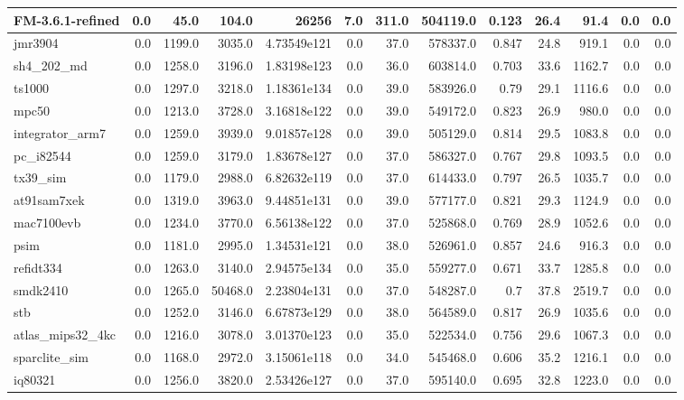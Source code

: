 \begin{tabular}{|l r r r r| r r r r r r | r r|}
\hline
FM-3.6.1-refined & 0.0 & 45.0 & 104.0 & 26256 & 7.0 & 311.0 & 504119.0 & 0.123 & 26.4 & 91.4 & 0.0 & 0.0 \\
\hline
jmr3904 & 0.0 & 1199.0 & 3035.0 & 4.73549e121 & 0.0 & 37.0 & 578337.0 & 0.847 & 24.8 & 919.1 & 0.0 & 0.0 \\
\hline
sh4\_202\_md & 0.0 & 1258.0 & 3196.0 & 1.83198e123 & 0.0 & 36.0 & 603814.0 & 0.703 & 33.6 & 1162.7 & 0.0 & 0.0 \\
\hline
ts1000 & 0.0 & 1297.0 & 3218.0 & 1.18361e134 & 0.0 & 39.0 & 583926.0 & 0.79 & 29.1 & 1116.6 & 0.0 & 0.0 \\
\hline
mpc50 & 0.0 & 1213.0 & 3728.0 & 3.16818e122 & 0.0 & 39.0 & 549172.0 & 0.823 & 26.9 & 980.0 & 0.0 & 0.0 \\
\hline
integrator\_arm7 & 0.0 & 1259.0 & 3939.0 & 9.01857e128 & 0.0 & 39.0 & 505129.0 & 0.814 & 29.5 & 1083.8 & 0.0 & 0.0 \\
\hline
pc\_i82544 & 0.0 & 1259.0 & 3179.0 & 1.83678e127 & 0.0 & 37.0 & 586327.0 & 0.767 & 29.8 & 1093.5 & 0.0 & 0.0 \\
\hline
tx39\_sim & 0.0 & 1179.0 & 2988.0 & 6.82632e119 & 0.0 & 37.0 & 614433.0 & 0.797 & 26.5 & 1035.7 & 0.0 & 0.0 \\
\hline
at91sam7xek & 0.0 & 1319.0 & 3963.0 & 9.44851e131 & 0.0 & 39.0 & 577177.0 & 0.821 & 29.3 & 1124.9 & 0.0 & 0.0 \\
\hline
mac7100evb & 0.0 & 1234.0 & 3770.0 & 6.56138e122 & 0.0 & 37.0 & 525868.0 & 0.769 & 28.9 & 1052.6 & 0.0 & 0.0 \\
\hline
psim & 0.0 & 1181.0 & 2995.0 & 1.34531e121 & 0.0 & 38.0 & 526961.0 & 0.857 & 24.6 & 916.3 & 0.0 & 0.0 \\
\hline
refidt334 & 0.0 & 1263.0 & 3140.0 & 2.94575e134 & 0.0 & 35.0 & 559277.0 & 0.671 & 33.7 & 1285.8 & 0.0 & 0.0 \\
\hline
smdk2410 & 0.0 & 1265.0 & 50468.0 & 2.23804e131 & 0.0 & 37.0 & 548287.0 & 0.7 & 37.8 & 2519.7 & 0.0 & 0.0 \\
\hline
stb & 0.0 & 1252.0 & 3146.0 & 6.67873e129 & 0.0 & 38.0 & 564589.0 & 0.817 & 26.9 & 1035.6 & 0.0 & 0.0 \\
\hline
atlas\_mips32\_4kc & 0.0 & 1216.0 & 3078.0 & 3.01370e123 & 0.0 & 35.0 & 522534.0 & 0.756 & 29.6 & 1067.3 & 0.0 & 0.0 \\
\hline
sparclite\_sim & 0.0 & 1168.0 & 2972.0 & 3.15061e118 & 0.0 & 34.0 & 545468.0 & 0.606 & 35.2 & 1216.1 & 0.0 & 0.0 \\
\hline
iq80321 & 0.0 & 1256.0 & 3820.0 & 2.53426e127 & 0.0 & 37.0 & 595140.0 & 0.695 & 32.8 & 1223.0 & 0.0 & 0.0 \\

\end{tabular}

